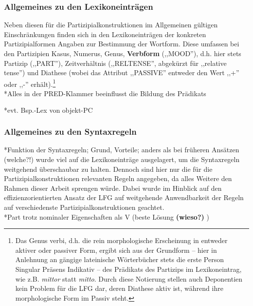 \documentclass[12pt,a4paper]{article}
\begin{document}
\subsubsection{Allgemeines zu den Lexikoneinträgen}

Neben diesen für die Partizipialkonstruktionen im Allgemeinen gültigen Einschränkungen finden sich in den Lexikoneinträgen der konkreten Partizipialformen Angaben zur Bestimmung der Wortform. Diese umfassen bei den Partizipien Kasus, Numerus, Genus, \textbf{Verbform} (,,MOOD''), d.h. hier stets Partizip (,,PART''), Zeitverhältnis (,,RELTENSE'', abgekürzt für ,,relative tense'') und Diathese (wobei das Attribut ,,PASSIVE'' entweder den Wert ,,+'' oder ,,-'' erhält).\footnote{Das Genus verbi, d.h. die rein morphologische Erscheinung in entweder aktiver oder passiver Form, ergibt sich aus der Grundform -- hier in Anlehnung an gängige lateinische Wörterbücher stets die erste Person Singular Präsens Indikativ -- des Prädikats des Partizips im Lexikoneintrag, wie z.B. \textit{mittor} statt \textit{mitto}. Durch diese Notierung stellen auch Deponentien kein Problem für die LFG dar, deren Diathese aktiv ist, während ihre morphologische Form im Passiv steht.} \\


*Alles in der PRED-Klammer beeinflusst die Bildung des Prädikats

*evt. Bsp.-Lex von objekt-PC












\subsubsection{Allgemeines zu den Syntaxregeln}
*Funktion der Syntaxregeln; Grund, Vorteile; anders als bei früheren Ansätzen (welche?!) wurde viel auf die Lexikoneinträge ausgelagert, um die Syntaxregeln weitgehend überschaubar zu halten. Dennoch sind hier nur die für die Partizipialkonstruktionen relevanten Regeln angegeben, da alles Weitere den Rahmen dieser Arbeit sprengen würde. Dabei wurde im Hinblick auf den effizienzorientierten Ansatz der LFG auf weitgehende Anwendbarkeit der Regeln auf verschiedenste Partizipialkonstruktionen geachtet. \\
*Part trotz nominaler Eigenschaften als V (beste Lösung \textbf{(wieso?)} ) \\
\end{document}
